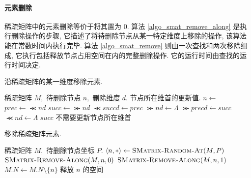 \paragraph{元素删除} 稀疏矩阵中的元素删除等价于将其置为 $0.$ 算法 \ref{algo_smat_remove_along} 是执行删除操作的步骤, 它描述了将待删除节点从某一特定维度上移除的操作, 该算法能在常数时间内执行完毕. 算法 \ref{algo_smat_remove} 则由一次查找和两次移除组成, 它执行包括释放节点占用空间在内的完整删除操作. 它的运行时间由查找的运行时间决定. 
\begin{breakablealgorithm}
\caption{沿稀疏矩阵的某一维度移除元素.}
\label{algo_smat_remove_along}
\begin{algorithmic}[1]
\Require 稀疏矩阵 $M,$ 待删除节点 $n,$ 删除维度 $d.$
\Ensure 节点所在维首的更新值.
    \State $n \gets$ 
    \State $prec \gets \Prec{n}{d}$
    \State $succ \gets \Succ{n}{d}$
        \State $\Prec{succ}{d} \gets prec$
        \State $\Succ{n}{d} \gets \Lambda$
    \EndIf
        \State $\Succ{prec}{d} \gets succ$
        \State $\Prec{n}{d} \gets \Lambda$
    \Else
        \State \Return $succ$
    \EndIf
    \State \Return 不需要更新节点所在维首
\EndFunction
\end{algorithmic}
\end{breakablealgorithm}

\begin{breakablealgorithm}
\caption{移除稀疏矩阵元素.}
\label{algo_smat_remove}
\begin{algorithmic}[1]
\Require 稀疏矩阵 $M,$ 待删除节点坐标 $P.$
    \State $\left\langle n, *\right\rangle \gets \textsc{SMatrix-Random-At}(M, P)$
    \State $\textsc{SMatrix-Remove-Along}(M, n, 0)$
    \State $\textsc{SMatrix-Remove-Along}(M, n, 1)$
    \State $M.N \gets M.N \setminus \{n\}$
    \State 释放 $n$ 的空间
\EndProcedure
\end{algorithmic}
\end{breakablealgorithm}


